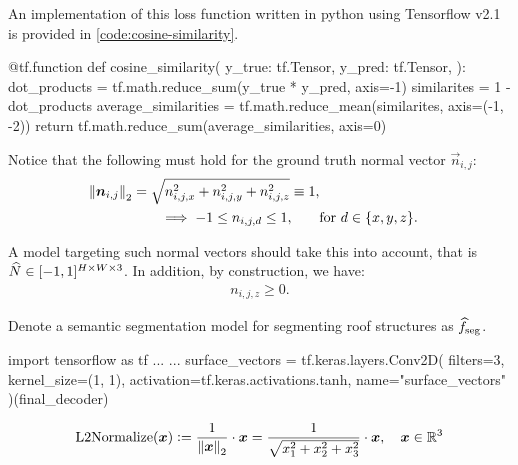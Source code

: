 \noindent
An implementation of this loss function written in python using Tensorflow v2.1 is provided in \cref{code:cosine-similarity}.
%
\begin{listing}[H]
  \caption{%
    Cosine similarity loss function implemented in Tensorflow v2.1.
  }%
  \label{code:cosine-similarity}
  \begin{pythoncode}
  @tf.function
  def cosine_similarity(
      y_true: tf.Tensor,
      y_pred: tf.Tensor,
  ):
      dot_products = tf.math.reduce_sum(y_true * y_pred, axis=-1)
      similarites = 1 - dot_products
      average_similarities = tf.math.reduce_mean(similarites, axis=(-1, -2))
      return tf.math.reduce_sum(average_similarities, axis=0)
  \end{pythoncode}
\end{listing}

Notice that the following must hold for the ground truth normal vector $\vec{n}_{i,j}$:
\begin{align*}
  \left\lVert\boldsymbol{n}_{i,j}\right\rVert_2 = \sqrt{n_{i,j,x}^2 + n_{i,j,y}^2 + n_{i,j,z}^2} \equiv 1, \\
  \implies -1 \leq n_{i,j,d} \leq 1, \qquad &\text{for } d \in \{x, y, z\}.
\end{align*}

%
A model targeting such normal vectors should take this into account, that is $\widehat{N} \in [-1, 1]^{H \times W \times 3}$.
%
In addition, by construction, we have:
%
\begin{align*}
  n_{i,j,z} \geq 0.
\end{align*}

Denote a semantic segmentation model for segmenting roof structures as $\widehat{f}_{\mathrm{seg}}$.

\begin{listing}[H]
  \caption{%
    TODO.
  }%
  \label{code:tanh-layer}
  \begin{pythoncode}
  import tensorflow as tf
  ...
  ...
  surface_vectors = tf.keras.layers.Conv2D(
      filters=3,
      kernel_size=(1, 1),
      activation=tf.keras.activations.tanh,
      name="surface_vectors"
  )(final_decoder)
  \end{pythoncode}
\end{listing}

\begin{equation*}
  \mathrm{L2Normalize}(\boldsymbol{x})
  \vcentcolon=
  \frac{1}{\left\lVert\boldsymbol{x}\right\rVert_2} \cdot \boldsymbol{x}
  =
  \frac{1}{\sqrt{x_1^2 + x_2^2 + x_3^2}} \cdot \boldsymbol{x}
  ,\quad \boldsymbol{x} \in \mathbb{R}^3
\end{equation*}

